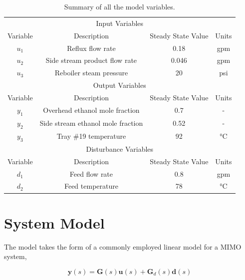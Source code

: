 \documentclass[a4paper,12pt]{article}
\begin{document}
\begin{table}[h]
	\label{teb:Variables}
	\centering
	\caption{Summary of all the model variables.}
	\begin{tabular}{cccc}
		\hline
		\multicolumn{4}{c}{Input Variables}                                       \\
		
		Variable & Description                       & Steady State Value & Units \\
		\hline
		$u_1$       & Reflux flow rate                  & 0.18               & gpm   \\
		$u_2$       & Side stream product flow rate     & 0.046              & gpm   \\
		$u_3$       & Reboiler steam pressure           & 20                 & psi   \\
		\hline
		\multicolumn{4}{c}{Output Variables}                                      \\
		
		Variable & Description                       & Steady State Value & Units \\
		\hline
		$y_1$       & Overhead ethanol mole fraction    & 0.7                & -     \\
		$y_2$       & Side stream ethanol mole fraction & 0.52               & -     \\
		$y_3$       & Tray \#19 temperature             & 92                 & \si{\celsius} \\
		\hline
		\multicolumn{4}{c}{Disturbance Variables}                                 \\
		
		Variable & Description                       & Steady State Value & Units \\
		\hline
		$d_1$       & Feed flow rate                    & 0.8                & gpm   \\
		$d_2$       & Feed temperature                  & 78                 & \si{\celsius} \\\hline
	\end{tabular}
\end{table}

\newpage
\section{System Model}

The model takes the form of a commonly employed linear model for a MIMO system,

\begin{equation}
\textbf{y}(s) = \textbf{G}(s)\textbf{u}(s) + \textbf{G}_{d}(s)\textbf{d}(s)
\end{equation}
\end{document}
